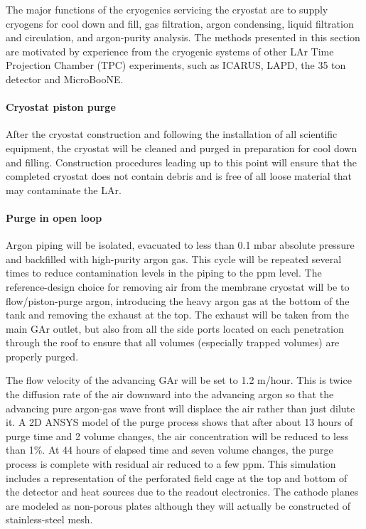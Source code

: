 The major functions of the cryogenics servicing the cryostat are to supply cryogens for cool down and fill, gas filtration, argon condensing, liquid filtration and circulation, and argon-purity analysis. The methods presented in this section are motivated by experience from the cryogenic systems of other LAr Time Projection Chamber (TPC) experiments, such as ICARUS, LAPD, the 35 ton detector and MicroBooNE.

\paragraph{Cryostat piston purge}
%
After the cryostat construction and following the installation of all scientific equipment, the cryostat will be cleaned and purged in preparation for cool down and filling. Construction procedures leading up to this point will ensure that the completed cryostat does not contain debris and is free of all loose material that may contaminate the LAr.

\paragraph{Purge in open loop}
%
Argon piping will be isolated, evacuated to less than 0.1 mbar  absolute pressure and backfilled with high-purity argon gas. This cycle will be repeated several times to reduce contamination levels in the piping to the ppm level. The reference-design choice for removing air from the membrane cryostat will be to flow/piston-purge argon, introducing the heavy argon gas at the bottom of the tank and removing the exhaust at the top. The exhaust will be taken from the main GAr outlet, but also from all the side ports located on each penetration through the roof to ensure that all volumes (especially trapped volumes) are properly purged.

The flow velocity of the advancing GAr will be set to 1.2 m/hour. This is twice the diffusion rate of the air downward into the advancing argon so that the advancing pure argon-gas wave front will displace the air rather than just dilute it. A 2D ANSYS model of the purge process shows that after about 13 hours of purge time and 2 volume changes, the air concentration will be reduced to less than 1\%. At 44 hours of elapsed time and seven volume changes, the purge process is complete with residual air reduced to a few ppm. This simulation includes a representation of the perforated field cage at the top and bottom of the detector and heat sources due to the readout electronics. The cathode planes are modeled as non-porous plates although they will actually be constructed of stainless-steel mesh. 


